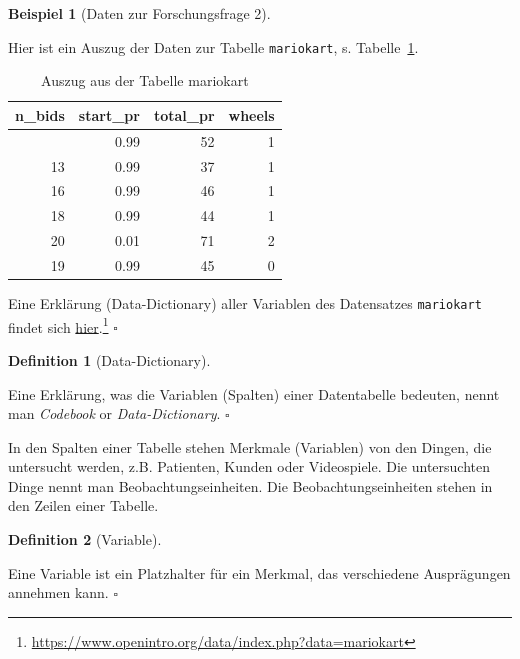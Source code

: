 \documentclass[
  letterpaper,
  twoside,
  open=any]{scrbook}
\theoremstyle{definition}
\newtheorem{definition}{Definition}[chapter]
\theoremstyle{definition}
\theoremstyle{definition}
\newtheorem{example}{Beispiel}[chapter]
\theoremstyle{remark}
\begin{document}
\begin{example}[Daten zur Forschungsfrage
2]\protect\hypertarget{exm-daten}{}\label{exm-daten}

Hier ist ein Auszug der Daten zur Tabelle \texttt{mariokart}, s.
Tabelle~\ref{tbl-mariokart}.

\begin{longtable}[]{@{}rrrr@{}}

\caption{\label{tbl-mariokart}Auszug aus der Tabelle mariokart}

\tabularnewline

\toprule\noalign{}
n\_bids & start\_pr & total\_pr & wheels \\
\midrule\noalign{}
\endhead
\bottomrule\noalign{}
\endlastfoot
20 & 0.99 & 52 & 1 \\
13 & 0.99 & 37 & 1 \\
16 & 0.99 & 46 & 1 \\
18 & 0.99 & 44 & 1 \\
20 & 0.01 & 71 & 2 \\
19 & 0.99 & 45 & 0 \\

\end{longtable}

Eine Erklärung (Data-Dictionary) aller Variablen des Datensatzes
\texttt{mariokart} findet sich
\href{https://www.openintro.org/data/index.php?data=mariokart}{hier}.\footnote{\url{https://www.openintro.org/data/index.php?data=mariokart}}
\(\square\)

\end{example}

\begin{definition}[Data-Dictionary]\protect\hypertarget{def-datadict}{}\label{def-datadict}

Eine Erklärung, was die Variablen (Spalten) einer Datentabelle bedeuten,
nennt man \emph{Codebook} or \emph{Data-Dictionary}. \(\square\)

\end{definition}

In den Spalten einer Tabelle stehen Merkmale (Variablen) von den Dingen,
die untersucht werden, z.B. Patienten, Kunden oder Videospiele. Die
untersuchten Dinge nennt man Beobachtungseinheiten. Die
Beobachtungseinheiten stehen in den Zeilen einer Tabelle.

\begin{definition}[Variable]\protect\hypertarget{def-var}{}\label{def-var}

Eine Variable ist ein Platzhalter für ein Merkmal, das verschiedene
Ausprägungen annehmen kann. \(\square\)

\end{definition}
\end{document}
